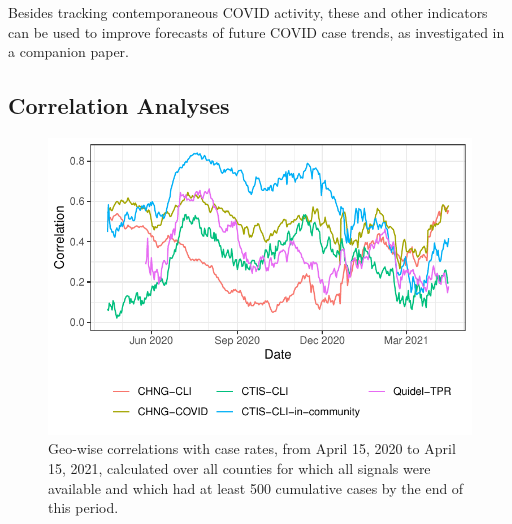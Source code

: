 \documentclass[9pt,twocolumn,twoside,lineno]{pnas-new}
\begin{document}

Besides tracking contemporaneous COVID activity, these and other indicators can
be used to improve forecasts of future COVID case trends, as investigated in a
companion paper.


\subsection{Correlation Analyses}

\begin{figure}[t]
  \includegraphics[width=\columnwidth]{fig/geo_wise_corr.pdf}
  \caption{Geo-wise correlations with case rates, from April 15, 2020 to April
    15, 2021, calculated over all counties for which all signals were available
    and which had at least 500 cumulative cases by the end of this period.}
 \label{fig:geo_wise_correlation}
\end{figure}
\end{document}
